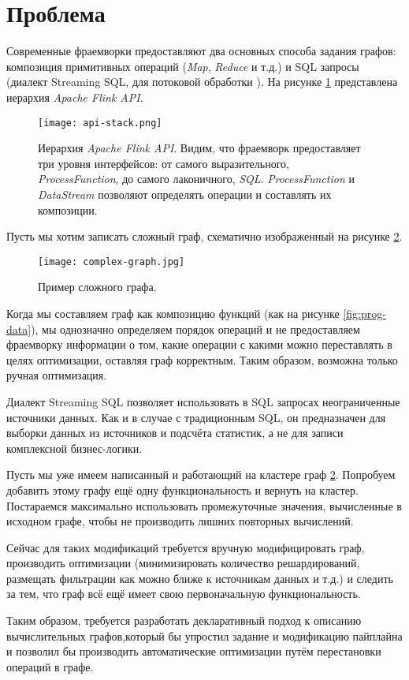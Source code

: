 \section{Проблема}

Современные фраемворки предоставляют два основных способа задания графов: композиция примитивных операций (\textit{Map}, \textit{Reduce} и т.д.) и SQL запросы (диалект Streaming SQL, для потоковой обработки \cite{streaming-sql}). На рисунке \ref{fig:api-stack} представлена иерархия \textit{Apache Flink API}.

\begin{figure}[h]
    \texttt{[image: api-stack.png]}
    \caption{Иерархия \textit{Apache Flink API}. Видим, что фраемворк предоставляет три уровня интерфейсов: от самого выразительного, \textit{ProcessFunction}, до самого лаконичного, \textit{SQL}. \textit{ProcessFunction} и \textit{DataStream} позволяют определять операции и составлять их композиции.}
    \label{fig:api-stack}
\end{figure}

Пусть мы хотим записать сложный граф, схематично изображенный на рисунке \ref{fig:complex-graph}.

\begin{figure}[h]
    \centering
    \texttt{[image: complex-graph.jpg]}
    \caption{Пример сложного графа.}
    \label{fig:complex-graph}
\end{figure}

Когда мы составляем граф как композицию функций (как на рисунке \ref{fig:prog-data}),
мы однозначно определяем порядок операций и не предоставляем фраемворку информации о том,
какие операции с какими можно переставлять в целях оптимизации, оставляя граф корректным.
Таким образом, возможна только ручная оптимизация.

Диалект Streaming SQL позволяет использовать в SQL запросах неограниченные источники данных.
Как и в случае с традиционным SQL, он предназначен для выборки данных из источников и подсчёта статистик, а не для записи комплексной бизнес-логики.

Пусть мы уже имеем написанный и работающий на кластере граф \ref{fig:complex-graph}.
Попробуем добавить этому графу ещё одну функциональность и вернуть на кластер.
Постараемся максимально использовать промежуточные значения, вычисленные в исходном графе, чтобы не производить лишних повторных вычислений.

Сейчас для таких модификаций требуется вручную модифицировать граф, производить оптимизации (минимизировать количество решардирований, размещать фильтрации как можно ближе к источникам данных и т.д.) и следить за тем, что граф всё ещё имеет свою первоначальную функциональность.

Таким образом, требуется разработать декларативный подход к описанию вычислительных графов,который бы упростил задание и модификацию пайплайна и позволил бы производить автоматические оптимизации путём перестановки операций в графе.
